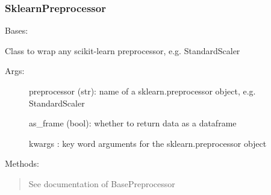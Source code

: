 \documentclass[letterpaper,10pt,english]{sphinxmanual}
\begin{document}
\begin{fulllineitems}
\begin{fulllineitems}
\begin{description}
\end{description}

\end{fulllineitems}


\begin{fulllineitems}
\label{\detokenize{api/mastml.preprocessing.NoPreprocessor:mastml.preprocessing.NoPreprocessor.transform}}
\end{fulllineitems}


\end{fulllineitems}



\subsubsection{SklearnPreprocessor}
\label{\detokenize{api/mastml.preprocessing.SklearnPreprocessor:sklearnpreprocessor}}\label{\detokenize{api/mastml.preprocessing.SklearnPreprocessor::doc}}

\begin{fulllineitems}
\label{\detokenize{api/mastml.preprocessing.SklearnPreprocessor:mastml.preprocessing.SklearnPreprocessor}}
Bases: {\hyperref[\detokenize{api/mastml.preprocessing.BasePreprocessor:mastml.preprocessing.BasePreprocessor}]{}}

Class to wrap any scikit-learn preprocessor, e.g. StandardScaler
\begin{description}
\item[{Args:}] \leavevmode
preprocessor (str): name of a sklearn.preprocessor object, e.g. StandardScaler

as\_frame (bool): whether to return data as a dataframe

kwargs : key word arguments for the sklearn.preprocessor object

\end{description}

Methods:
\begin{quote}

See documentation of BasePreprocessor
\end{quote}

\end{fulllineitems}
\end{document}
